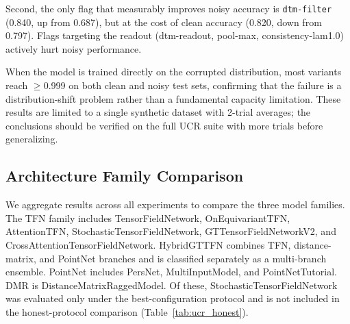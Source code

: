 \documentclass[a4paper,11pt]{article}
\begin{document}
Second, the only flag that measurably improves noisy accuracy is \texttt{dtm-filter} (0.840, up from 0.687), but at the cost of clean accuracy (0.820, down from 0.797).
Flags targeting the readout (dtm-readout, pool-max, consistency-lam1.0) actively hurt noisy performance.

When the model is trained directly on the corrupted distribution, most variants reach $\geq$0.999 on both clean and noisy test sets, confirming that the failure is a distribution-shift problem rather than a fundamental capacity limitation.
These results are limited to a single synthetic dataset with 2-trial averages; the conclusions should be verified on the full UCR suite with more trials before generalizing.

\subsection{Architecture Family Comparison} \label{sec:family}

We aggregate results across all experiments to compare the three model families.
The TFN family includes TensorFieldNetwork, OnEquivariantTFN, AttentionTFN, StochasticTensorFieldNetwork, GTTensorFieldNetworkV2, and CrossAttentionTensorFieldNetwork.
HybridGTTFN combines TFN, distance-matrix, and PointNet branches and is classified separately as a multi-branch ensemble.
PointNet includes PersNet, MultiInputModel, and PointNetTutorial.
DMR is DistanceMatrixRaggedModel.
Of these, StochasticTensorFieldNetwork was evaluated only under the best-configuration protocol and is not included in the honest-protocol comparison (Table~\ref{tab:ucr_honest}).
\end{document}
